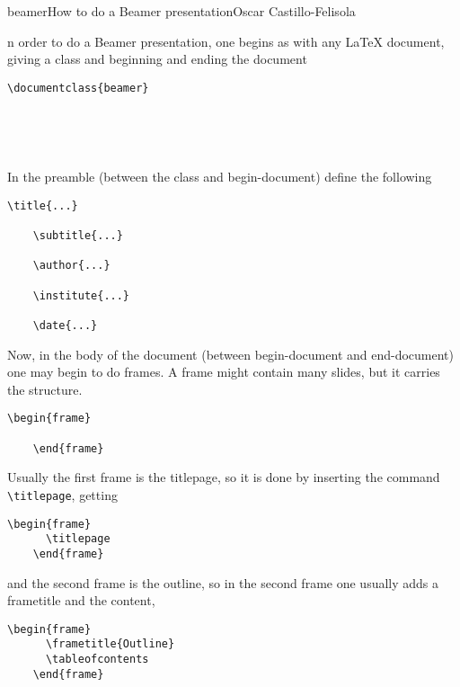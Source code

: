 \begin{article}[2]{beamer}{How to do a Beamer presentation}{Oscar Castillo-Felisola}

  n order to do a Beamer presentation, one begins as with any LaTeX document, giving a class and beginning and ending the document
  \begin{lstlisting}[style=LaTeX]
    \documentclass{beamer}

    

    
  \end{lstlisting}

  In the preamble (between the class and begin-document) define the following
  \begin{lstlisting}[style=LaTeX]
    \title{...}

    \subtitle{...}

    \author{...}

    \institute{...}

    \date{...}
  \end{lstlisting}

  Now, in the body of the document (between begin-document and end-document)  one may begin to do frames. A frame might contain many slides, but it carries the structure.
  \begin{lstlisting}[style=LaTeX]
    \begin{frame}

    \end{frame}
  \end{lstlisting}

  Usually the first frame is the titlepage, so it is done by inserting the command \lstinline[style=LaTeX]!\titlepage!, getting
  \begin{lstlisting}[style=LaTeX]
    \begin{frame}
      \titlepage
    \end{frame}
  \end{lstlisting}
  and the second frame is the outline, so in the second frame one usually adds a frametitle and the content,
  \begin{lstlisting}[style=LaTeX]
    \begin{frame}
      \frametitle{Outline}
      \tableofcontents
    \end{frame}
  \end{lstlisting}


\end{article}
